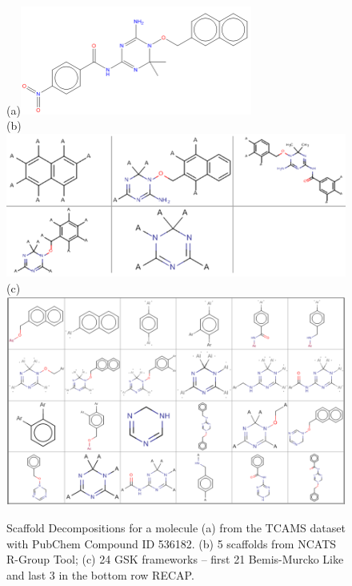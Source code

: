 \documentclass[journal=jacsat,manuscript=article]{achemso}
\begin{document}
\begin{figure}

(a)\includegraphics[width=3in]{fig/tcam1_mol.png}\\
\vspace{0.1in}
(b)\includegraphics[width=5in]{fig/tcam1_RGscaf.png}\\
\vspace{0.1in}
(c)\includegraphics[width=5in]{fig/tcam1_GSKframes.png}
\caption{Scaffold Decompositions for a molecule (a) from the TCAMS dataset with PubChem Compound ID 536182. (b) 5 scaffolds from NCATS R-Group Tool; (c) 24 GSK frameworks -- first 21 Bemis-Murcko Like and last 3 in the bottom row RECAP.}
\label{fig:scafmethod}
\end{figure}
\end{document}
